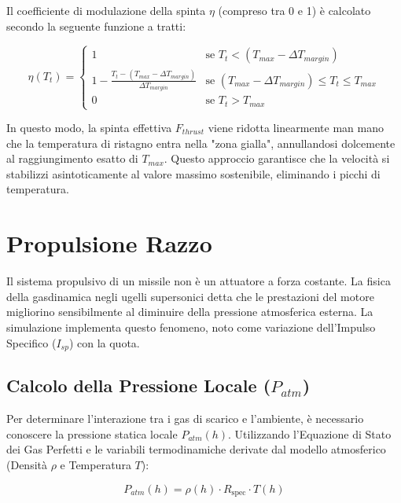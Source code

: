 \documentclass[12pt,a4paper]{article}
\begin{document}
Il coefficiente di modulazione della spinta $\eta$ (compreso tra 0 e 1) è calcolato secondo la seguente funzione a tratti:

\begin{equation}
    \eta(T_t) = 
    \begin{cases} 
        1 & \text{se } T_t < (T_{max} - \Delta T_{margin}) \\
        1 - \frac{T_t - (T_{max} - \Delta T_{margin})}{\Delta T_{margin}} & \text{se } (T_{max} - \Delta T_{margin}) \le T_t \le T_{max} \\
        0 & \text{se } T_t > T_{max}
    \end{cases}
\end{equation}

In questo modo, la spinta effettiva $F_{thrust}$ viene ridotta linearmente man mano che la temperatura di ristagno entra nella "zona gialla", annullandosi dolcemente al raggiungimento esatto di $T_{max}$. Questo approccio garantisce che la velocità si stabilizzi asintoticamente al valore massimo sostenibile, eliminando i picchi di temperatura.







\section{Propulsione Razzo }

Il sistema propulsivo di un missile non è un attuatore a forza costante. La fisica della gasdinamica negli ugelli supersonici detta che le prestazioni del motore migliorino sensibilmente al diminuire della pressione atmosferica esterna. La simulazione implementa questo fenomeno, noto come variazione dell'Impulso Specifico ($I_{sp}$) con la quota.

\subsection{Calcolo della Pressione Locale ($P_{atm}$)}
Per determinare l'interazione tra i gas di scarico e l'ambiente, è necessario conoscere la pressione statica locale $P_{atm}(h)$. Utilizzando l'Equazione di Stato dei Gas Perfetti e le variabili termodinamiche derivate dal modello atmosferico (Densità $\rho$ e Temperatura $T$):

\begin{equation}
    P_{atm}(h) = \rho(h) \cdot R_{\text{spec}} \cdot T(h)
\end{equation}
\end{document}
